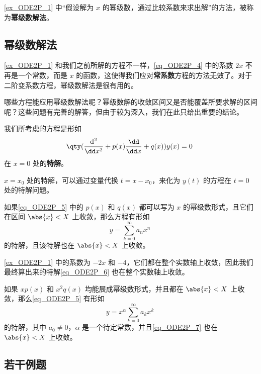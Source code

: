 \autoref{ex_ODE2P_1} 中“假设解为 $x$ 的幂级数，通过比较系数来求出解”的方法，被称为\textbf{幂级数解法}。


\subsection{幂级数解法}

\autoref{ex_ODE2P_1} 和我们之前所解的方程不一样，\autoref{eq_ODE2P_4} 中的系数 $2x$ 不再是一个常数，而是 $x$ 的函数，这使得我们应对\textbf{常系数}方程的方法无效了。对于二阶变系数方程，幂级数解法是很有用的。

哪些方程能应用幂级数解法呢？幂级数解的收敛区间又是否能覆盖所要求解的区间呢？这些问题有完善的解答，但由于较为深入，我们在此只给出重要的结论。

我们所考虑的方程是形如
\begin{equation}\label{eq_ODE2P_5}
\qty(\frac{\mathrm{d}^2}{\dd x^2}+p(x)\frac{\dd}{\dd x}+q(x))y(x)=0~
\end{equation}
在 $x=0$ 处的\textbf{特解}。

$x=x_0$ 处的特解，可以通过变量代换 $t=x-x_0$，来化为 $y(t)$ 的方程在 $t=0$ 处的特解问题。

\begin{theorem}{}\label{the_ODE2P_2}
如果\autoref{eq_ODE2P_5} 中的 $p(x)$ 和 $q(x)$ 都可以写为 $x$ 的幂级数形式，且它们在区间 $\abs{x}<X$ 上收敛，那么方程有形如
\begin{equation}
y=\sum\limits_{k=0}^\infty a_nx^n~
\end{equation}
的特解，且该特解也在 $\abs{x}<X$ 上收敛。
\end{theorem}

\autoref{ex_ODE2P_1} 中的系数为 $-2x$ 和 $-4$，它们都在整个实数轴上收敛，因此我们最终算出来的特解\autoref{eq_ODE2P_6} 也在整个实数轴上收敛。

\begin{theorem}{}\label{the_ODE2P_1}
如果 $xp(x)$ 和 $x^2q(x)$ 均能展成幂级数形式，并且都在 $\abs{x}<X$ 上收敛，那么\autoref{eq_ODE2P_5} 有形如
\begin{equation}\label{eq_ODE2P_7}
y=x^\alpha\sum\limits_{k=0}^\infty a_kx^k~
\end{equation}
的特解，其中 $a_0\neq 0$，$\alpha$ 是一个待定常数，并且\autoref{eq_ODE2P_7} 也在 $\abs{x}<X$ 上收敛。


\end{theorem}


\subsection{若干例题}

